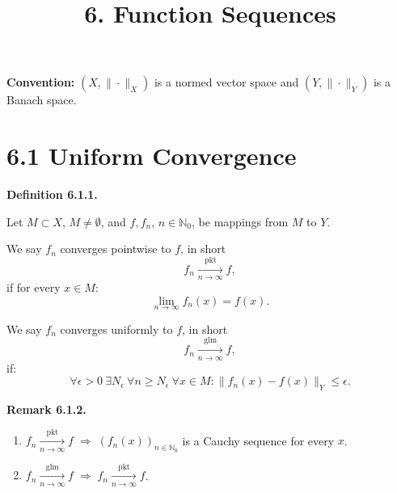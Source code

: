 \documentclass[12pt]{article}
\title{6. Function Sequences}
\date{}
\newenvironment{definition}[1]{%
  \par\vspace{6pt}\noindent\textbf{Definition #1.}\itshape\space
}{%
  \par\vspace{6pt}
}
\newenvironment{bemerkung}[1]{%
  \par\vspace{6pt}\noindent\textbf{Remark #1.}\itshape\space
}{%
  \par\vspace{6pt}
}
\begin{document}
\maketitle

\noindent\textbf{Convention:} $(X,\|\cdot\|_X)$ is a normed vector space and $(Y,\|\cdot\|_Y)$ is a Banach space.

\section{6.1 Uniform Convergence}

\begin{definition}{6.1.1}
Let $M \subset X$, $M \neq \emptyset$, and $f, f_n$, $n \in \mathbb{N}_0$, be mappings from $M$ to $Y$.

We say $f_n$ converges pointwise to $f$, in short
\[
f_n \xrightarrow[n\to\infty]{\mathrm{pkt}} f,
\]
if for every $x \in M$:
\[
\lim_{n\to\infty} f_n(x) = f(x).
\]

We say $f_n$ converges uniformly to $f$, in short
\[
f_n \xrightarrow[n\to\infty]{\mathrm{glm}} f,
\]
if:
\[
\forall \epsilon > 0\ \exists N_\epsilon\ \forall n \ge N_\epsilon\ \forall x \in M:
\|f_n(x)-f(x)\|_Y \le \epsilon.
\]
\end{definition}

\begin{bemerkung}{6.1.2}
\hfill
\begin{enumerate}
    \item $f_n \xrightarrow[n\to\infty]{\mathrm{pkt}} f \;\Longrightarrow\; (f_n(x))_{n\in\mathbb{N}_0}$ is a Cauchy sequence for every $x$.
    \item $f_n \xrightarrow[n\to\infty]{\mathrm{glm}} f \;\Longrightarrow\; f_n \xrightarrow[n\to\infty]{\mathrm{pkt}} f$.
\end{enumerate}
\end{bemerkung}
\end{document}
